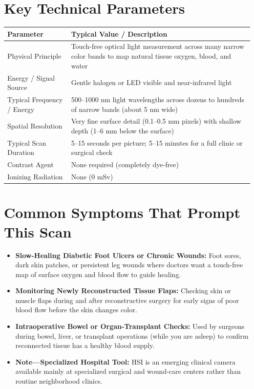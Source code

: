 \section{Key Technical Parameters}
\noindent
\begin{tabularx}{\textwidth}{@{}l X@{}}
\toprule
\textbf{Parameter} & \textbf{Typical Value / Description} \\
\midrule
Physical Principle & Touch-free optical light measurement across many narrow color bands to map natural tissue oxygen, blood, and water \\
Energy / Signal Source & Gentle halogen or LED visible and near-infrared light \\
Typical Frequency / Energy & 500--1000 nm light wavelengths across dozens to hundreds of narrow bands (about 5 nm wide) \\
Spatial Resolution & Very fine surface detail (0.1--0.5 mm pixels) with shallow depth (1--6 mm below the surface) \\
Typical Scan Duration & 5--15 seconds per picture; 5--15 minutes for a full clinic or surgical check \\
Contrast Agent & None required (completely dye-free) \\
Ionizing Radiation & None (0 mSv) \\
\bottomrule
\end{tabularx}

\section{Common Symptoms That Prompt This Scan}
\begin{itemize}
    \item \textbf{Slow-Healing Diabetic Foot Ulcers or Chronic Wounds:} Foot sores, dark skin patches, or persistent leg wounds where doctors want a touch-free map of surface oxygen and blood flow to guide healing.
    \item \textbf{Monitoring Newly Reconstructed Tissue Flaps:} Checking skin or muscle flaps during and after reconstructive surgery for early signs of poor blood flow before the skin changes color.
    \item \textbf{Intraoperative Bowel or Organ-Transplant Checks:} Used by surgeons during bowel, liver, or transplant operations (while you are asleep) to confirm reconnected tissue has a healthy blood supply.
    \item \textbf{Note---Specialized Hospital Tool:} HSI is an emerging clinical camera available mainly at specialized surgical and wound-care centers rather than routine neighborhood clinics.
\end{itemize}


